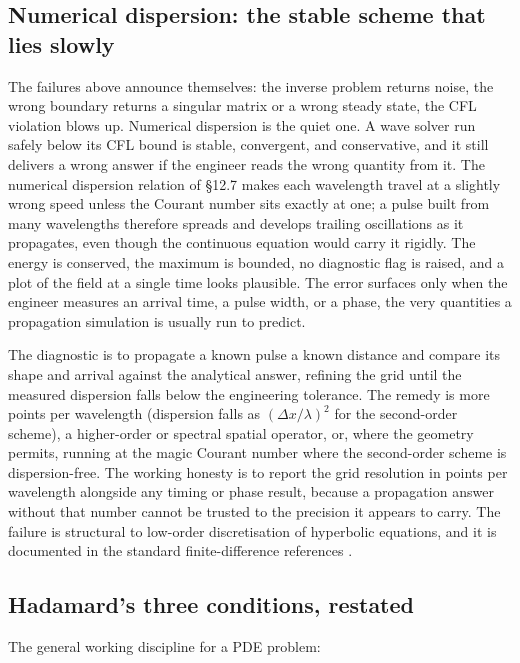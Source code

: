 \subsection{Numerical dispersion: the stable scheme that lies slowly}

The failures above announce themselves: the inverse problem returns
noise, the wrong boundary returns a singular matrix or a wrong
steady state, the CFL violation blows up. Numerical dispersion is
the quiet one. A wave solver run safely below its CFL bound is
stable, convergent, and conservative, and it still delivers a wrong
answer if the engineer reads the wrong quantity from it. The
numerical dispersion relation of §12.7 makes each wavelength travel
at a slightly wrong speed unless the Courant number sits exactly at
one; a pulse built from many wavelengths therefore spreads and
develops trailing oscillations as it propagates, even though the
continuous equation would carry it rigidly. The energy is conserved,
the maximum is bounded, no diagnostic flag is raised, and a plot of
the field at a single time looks plausible. The error surfaces only
when the engineer measures an arrival time, a pulse width, or a
phase, the very quantities a propagation simulation is usually run
to predict.

The diagnostic is to propagate a known pulse a known distance and
compare its shape and arrival against the analytical answer, refining
the grid until the measured dispersion falls below the engineering
tolerance. The remedy is more points per wavelength (dispersion
falls as $(\Delta x/\lambda)^{2}$ for the second-order scheme),
a higher-order or spectral spatial operator, or, where the geometry
permits, running at the magic Courant number where the second-order
scheme is dispersion-free. The working honesty is to report the grid
resolution in points per wavelength alongside any timing or
phase result, because a propagation answer without that number
cannot be trusted to the precision it appears to carry. The failure
is structural to low-order discretisation of hyperbolic equations,
and it is documented in the standard finite-difference references
\cite{text:v2ch12-leveque-fdm,text:v2ch12-morton-mayers}.

\subsection{Hadamard's three conditions, restated}

The general working discipline for a PDE problem:

